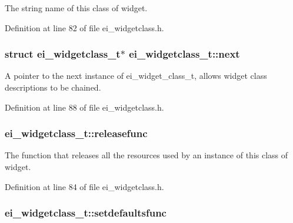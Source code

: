 The string name of this class of widget. 



Definition at line 82 of file ei\+\_\+widgetclass.\+h.

\hypertarget{structei__widgetclass__t_aa184e650475ec2451f033858db1876f0}{
\subsubsection[{next}]{\setlength{\rightskip}{0pt plus 5cm}struct {\bf ei\+\_\+widgetclass\+\_\+t}$\ast$ ei\+\_\+widgetclass\+\_\+t\+::next}}\label{structei__widgetclass__t_aa184e650475ec2451f033858db1876f0}


A pointer to the next instance of ei\+\_\+widget\+\_\+class\+\_\+t, allows widget class descriptions to be chained. 



Definition at line 88 of file ei\+\_\+widgetclass.\+h.

\hypertarget{structei__widgetclass__t_aebe6139b31816495e866c99ec3e83de6}{
\subsubsection[{releasefunc}]{ ei\+\_\+widgetclass\+\_\+t\+::releasefunc}}\label{structei__widgetclass__t_aebe6139b31816495e866c99ec3e83de6}


The function that releases all the resources used by an instance of this class of widget. 



Definition at line 84 of file ei\+\_\+widgetclass.\+h.

\hypertarget{structei__widgetclass__t_a5fec706eefca10172d897cf61b268510}{
\subsubsection[{setdefaultsfunc}]{ ei\+\_\+widgetclass\+\_\+t\+::setdefaultsfunc}}\label{structei__widgetclass__t_a5fec706eefca10172d897cf61b268510}


